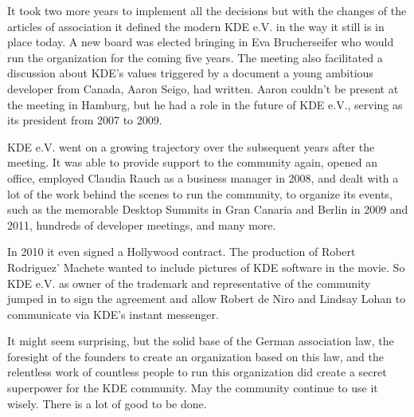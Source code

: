 It took two more years to implement all the decisions but with the changes of the articles of association it defined the modern KDE e.V. in the way it still is in place today. A new board was elected bringing in Eva Brucherseifer who would run the organization for the coming five years. The meeting also facilitated a discussion about KDE's values triggered by a document a young ambitious developer from Canada, Aaron Seigo, had written. Aaron couldn't be present at the meeting in Hamburg, but he had a role in the future of KDE e.V., serving as its president from 2007 to 2009.

KDE e.V. went on a growing trajectory over the subsequent years after the meeting. It was able to provide support to the community again, opened an office, employed Claudia Rauch as a business manager in 2008, and dealt with a lot of the work behind the scenes to run the community, to organize its events, such as the memorable Desktop Summits in Gran Canaria and Berlin in 2009 and 2011, hundreds of developer meetings, and many more.

In 2010 it even signed a Hollywood contract. The production of Robert Rodriguez' Machete wanted to include pictures of KDE software in the movie. So KDE e.V. as owner of the trademark and representative of the community jumped in to sign the agreement and allow Robert de Niro and Lindsay Lohan to communicate via KDE's instant messenger.

It might seem surprising, but the solid base of the German association law, the foresight of the founders to create an organization based on this law, and the relentless work of countless people to run this organization did create a secret superpower for the KDE community. May the community continue to use it wisely. There is a lot of good to be done.
